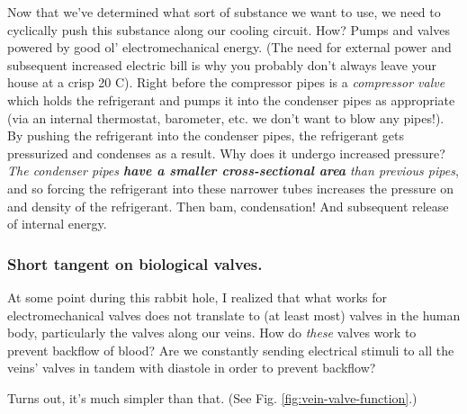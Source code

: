 \documentclass[../main/main.tex]{subfiles}
\begin{document}
Now that we've determined what sort of substance we want to use,
we need to cyclically push this substance along our cooling circuit.
How?
Pumps and valves powered by good ol' electromechanical energy.
(The need for external power and subsequent increased
electric bill is why you probably 
don't always leave your house
at a crisp 20 \textdegree C).
Right before the compressor pipes is a \emph{compressor valve}
which holds the refrigerant and pumps it into the condenser pipes
as appropriate (via an internal thermostat, barometer,
etc. \textemdash{} we don't want to blow any pipes!).
By pushing the refrigerant into the condenser pipes, the refrigerant
gets pressurized and condenses as a result. Why does it undergo
increased pressure?
\emph{The condenser pipes
\textbf{have a smaller cross-sectional area}
than previous pipes},
and so forcing the refrigerant into these narrower tubes 
increases the pressure on and density of the refrigerant.
Then bam, condensation! And subsequent release of internal energy.



\subsubsection{Short tangent on biological valves.}
At some point during this rabbit hole, I realized that what
works for electromechanical valves does not translate to (at least most)
valves in the human body, particularly the valves along our veins.
How do \emph{these} valves work to prevent backflow of blood?
Are we constantly sending electrical stimuli to all the veins' valves
in tandem with diastole in order to prevent backflow?\par

Turns out, it's much simpler than that. (See Fig. \ref{fig:vein-valve-function}.)
\end{document}
